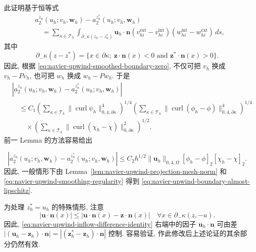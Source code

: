 \begin{Proof}
此证明基于恒等式
\begin{equation}\label{eq:navier-upwind-inflow-difference-identity}
\begin{aligned}
&a_2^{z_h}(u_h;v_h,\boldsymbol w_h)
-a_2^{z_h^*}(u_h;v_h,\boldsymbol w_h)\\
&\quad=\sum_{\kappa\in\mathcal T_h}
\int_{\partial_-\kappa(z_h-z_h^*)}
\boldsymbol u_h\cdot\boldsymbol n
(v_{hi}^{\mathrm{ext}}-v_{hi}^{\mathrm{int}})
(w_{hi}^{\mathrm{int}}-w_{hi}^{\mathrm{ext}})\,ds,
\end{aligned}
\end{equation}
其中
\[
\partial_-\kappa(z-z^*)
=\{x\in\partial\kappa;
\ \boldsymbol z\cdot\boldsymbol n(x)<0
\text{ and }\boldsymbol z^*\cdot\boldsymbol n(x)>0\}.
\]
因此, 根据 \eqref{eq:navier-upwind-smoothed-boundary-zero}, 不仅可把 $v_h$ 换成
$v_h-Pv_h$, 也可把 $w_h$ 换成 $w_h-Pw_h$. 于是
\[
\begin{aligned}
&|a_2^{z_h}(u_h;v_h,\boldsymbol w_h)
-a_2^{z_h^*}(u_h;v_h,\boldsymbol w_h)|\\
&\quad\leq C_1
\left(\sum_{\kappa\in\mathcal T_h}
\|\operatorname{curl}\psi_h\|_{0,4,\partial\kappa}^4\right)^{1/4}
\left(\sum_{\kappa\in\mathcal T_h}
\|\operatorname{curl}(\phi_h-\phi)\|_{0,4,\partial\kappa}^4\right)^{1/4}\\
&\qquad\times
\left(\sum_{\kappa\in\mathcal T_h}
\|\operatorname{curl}(\chi_h-\chi)\|_{0,\partial\kappa}^2\right)^{1/2}.
\end{aligned}
\]
前一 Lemma 的方法容易给出

\begin{equation}\label{eq:navier-upwind-inflow-difference-bound}
|a_2^{z_h}(u_h;v_h,\boldsymbol w_h)
-a_2^{z_h^*}(u_h;v_h,\boldsymbol w_h)|
\leq C_2h^{1/2}\|\boldsymbol u_h\|_{0,4,\Omega}
[\phi_h-\phi]_2[\chi_h-\chi]_2.
\end{equation}
因此, 一般情形下由 Lemma~\ref{lem:navier-upwind-projection-mesh-norm} 和
\eqref{eq:navier-upwind-smoothing-regularity} 得到
\eqref{eq:navier-upwind-boundary-almost-lipschitz}.

为处理 $z_h^*=u_h$ 的特殊情形, 注意
\[
|\boldsymbol u\cdot\boldsymbol n(x)|
\leq|\boldsymbol u\cdot\boldsymbol n(x)-\boldsymbol z\cdot\boldsymbol n(x)|
\quad\forall x\in\partial_-\kappa(z,-u).
\]
因此, \eqref{eq:navier-upwind-inflow-difference-identity} 右端中的因子
$\boldsymbol u_h\cdot\boldsymbol n$ 可由差
$|(\boldsymbol u_h-\boldsymbol z_h)\cdot\boldsymbol n|
=|(\boldsymbol z_h^*-\boldsymbol z_h)\cdot\boldsymbol n|$ 控制.
容易验证, 作此修改后上述论证的其余部分仍然有效.
\end{Proof}

